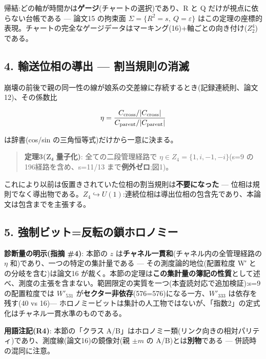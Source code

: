 \documentclass[
]{ltjsarticle}
\begin{document}
帰結:どの軸が時間かは\textbf{ゲージ}(チャートの選択)であり、R と Q
だけが視点に依らない台帳である --- 論文15 の拘束面
\(\Sigma=\{R^2=s,\ Q=\varepsilon\}\)
はこの定理の座標的表現。チャートの完全なゲージデータはマーキング(16)+軸ごとの向き付け(\(Z_2^{4}\))である。

\subsection{4. 輸送位相の導出 ---
割当規則の消滅}\label{ux8f38ux9001ux4f4dux76f8ux306eux5c0eux51fa-ux5272ux5f53ux898fux5247ux306eux6d88ux6ec5}

崩壊の前後で親の同一性の線が娘系の交差線に存続するとき(記録連続則、論文12)、その係数比

\[
\eta=\frac{C_{\rm cross}/|C_{\rm cross}|}{C_{\rm parent}/|C_{\rm parent}|}
\]

は辞書(cos/sin の三角恒等式)だけから一意に決まる。

\begin{quote}
\textbf{定理3(Z₄ 量子化)}: 全ての二段管理経路で
\(\eta\in Z_4=\{1,i,-1,-i\}\)(s=9 の196経路を含め、s=11/13
まで\textbf{例外ゼロ};図1)。
\end{quote}

これにより以前は仮置きされていた位相の割当規則は\textbf{不要になった}
---
位相は規則でなく導出物である。\(Z_4\hookrightarrow U(1)\):連続位相は導出位相の包含先であり、本論文は包含までを主張する。

\subsection{5.
強制ビット=反転の鎖ホロノミー}\label{ux5f37ux5236ux30d3ux30c3ux30c8ux53cdux8ee2ux306eux9396ux30dbux30edux30ceux30dfux30fc}

\textbf{診断量の明示(指摘 \#4)}: 本節の \(z\)
は\textbf{チャネル一貫和}(チャネル内の全管理経路の \(\eta\)
和)であり、一つの特定の集計量である --- その測度論的地位(配置粒度 W′
との分岐を含む)は論文16
が裁く。本節の定理は\textbf{この集計量の簿記の性質}として述べ、測度の主張を含まない。範囲限定の実質を一つ(本査読対応で追加検証):s=9
の配置粒度では \(W'_{531}\)
が\textbf{セクター非依存}(576=576)になる一方、\(W'_{333}\)
は依存を残す(40 vs 16)---
ホロノミービットは集計の人工物ではないが、「指数2」の定式化はチャネル一貫水準のものである。

\textbf{用語注記(R4)}: 本節の「クラス
A/B」はホロノミー類(リンク向きの相対パリティ)であり、測度線(論文16)の鏡像対(親
\(\pm m\) の A/B)とは\textbf{別物}である --- 併読時の混同に注意。
\end{document}
